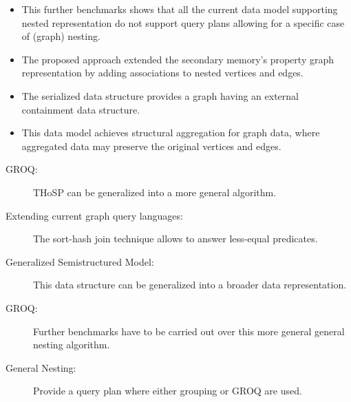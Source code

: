 \begin{lucido}[Results]
\begin{itemize}
	\item This further benchmarks shows that all the current data model supporting nested representation do not support query plans allowing for a specific case of (graph) nesting.
	
	\item  The proposed approach extended the secondary memory's property graph representation by adding associations to nested vertices and edges.
	
	\item The serialized data structure provides a graph having an external containment data structure.	
	
	\item This data model achieves \alert{structural aggregation} for graph data, where aggregated data
	may preserve the original vertices and edges.
\end{itemize}
\end{lucido}

\begin{lucido}
\begin{description}
	\item[GROQ:] THoSP can be generalized into a more general algorithm.
	\item[Extending current graph query languages:] The sort-hash join technique allows to answer less-equal predicates.
	\item[Generalized Semistructured Model:] This data structure can be generalized into a broader data representation.
\end{description}
\end{lucido}

\begin{lucido}
\begin{description}
	\item[GROQ:] Further benchmarks have to be carried out over this more general general nesting algorithm.
	\item[General Nesting:] Provide a query plan where either grouping or GROQ are used.
\end{description}
\end{lucido}